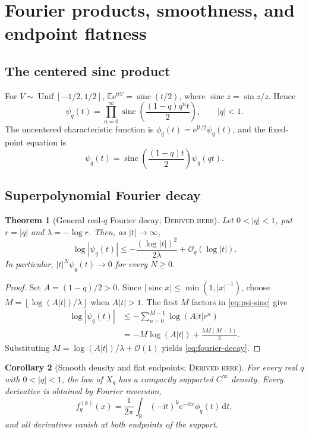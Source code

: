 \documentclass[11pt,oneside]{article}
\newtheorem{theorem}{Theorem}[section]
\newtheorem{corollary}[theorem]{Corollary}
\theoremstyle{definition}
\theoremstyle{remark}
\newcommand{\R}{\mathbb R}
\newcommand{\E}{\mathbb E}
\newcommand{\Unif}{\operatorname{Unif}}
\newcommand{\sinc}{\operatorname{sinc}}
\newcommand{\ii}{\mathrm i}
\newcommand{\e}{\mathrm e}
\newcommand{\dd}{\,\mathrm d}
\newcommand{\bigO}{\mathcal O}
\newcommand{\floor}[1]{\left\lfloor#1\right\rfloor}
\newcommand{\Derived}{\textsc{Derived here}}
\begin{document}
\section{Fourier products, smoothness, and endpoint flatness}

\subsection{The centered sinc product}
For \(V\sim\Unif[-1/2,1/2]\),
\(\E\e^{\ii tV}=\sinc(t/2)\), where \(\sinc z=\sin z/z\).  Hence
\begin{equation}\label{eq:psi-sinc}
 \psi_q(t)=\prod_{n=0}^{\infty}
 \sinc\!\left(\frac{(1-q)q^nt}{2}\right),
 \qquad |q|<1.
\end{equation}
The uncentered characteristic function is
\(\phi_q(t)=\e^{\ii t/2}\psi_q(t)\), and the fixed-point equation is
\begin{equation}\label{eq:psi-refinement}
 \psi_q(t)=\sinc\!\left(\frac{(1-q)t}{2}\right)\psi_q(qt).
\end{equation}

\subsection{Superpolynomial Fourier decay}
\begin{theorem}[General real-\(q\) Fourier decay; \Derived]\label{thm:fourier-decay}
Let \(0<|q|<1\), put \(r=|q|\) and \(\lambda=-\log r\).  Then, as
\(|t|\to\infty\),
\begin{equation}\label{eq:fourier-decay}
 \log|\psi_q(t)|
 \le -\frac{(\log|t|)^2}{2\lambda}+\bigO_q(\log|t|).
\end{equation}
In particular, \(|t|^N\psi_q(t)\to0\) for every \(N\ge0\).
\end{theorem}

\begin{proof}
Set \(A=(1-q)/2>0\).  Since
\(|\sinc x|\le\min(1,|x|^{-1})\), choose
\(M=\floor{\log(A|t|)/\lambda}\) when \(A|t|>1\).  The first \(M\) factors in
\eqref{eq:psi-sinc} give
\begin{align*}
 \log|\psi_q(t)|
 &\le -\sum_{n=0}^{M-1}\log(A|t|r^n)\\
 &=-M\log(A|t|)+\frac{\lambda M(M-1)}2.
\end{align*}
Substituting \(M=\log(A|t|)/\lambda+\bigO(1)\) yields
\eqref{eq:fourier-decay}.
\end{proof}

\begin{corollary}[Smooth density and flat endpoints; \Derived]
For every real \(q\) with \(0<|q|<1\), the law of \(X_q\) has a compactly
supported \(C^\infty\) density.  Every derivative is obtained by Fourier
inversion,
\begin{equation}\label{eq:density-derivative}
 f_q^{(k)}(x)=\frac1{2\pi}\int_{\R}(-\ii t)^k\e^{-\ii tx}\phi_q(t)\dd t,
\end{equation}
and all derivatives vanish at both endpoints of the support.
\end{corollary}
\end{document}
